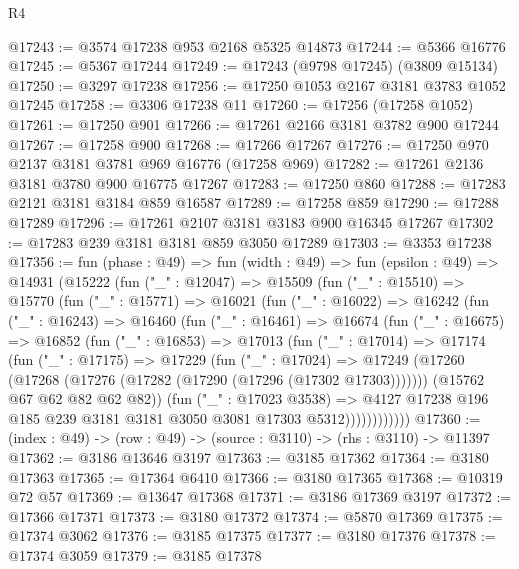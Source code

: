 \begin{lexlean}{R4}
\begin{coremodule}
@17243 := @3574 @17238 @953 @2168 @5325 @14873
@17244 := @5366 @16776
@17245 := @5367 @17244
@17249 := @17243 (@9798 @17245) (@3809 @15134)
@17250 := @3297 @17238
@17256 := @17250 @1053 @2167 @3181 @3783 @1052 @17245
@17258 := @3306 @17238 @11
@17260 := @17256 (@17258 @1052)
@17261 := @17250 @901
@17266 := @17261 @2166 @3181 @3782 @900 @17244
@17267 := @17258 @900
@17268 := @17266 @17267
@17276 := @17250 @970 @2137 @3181 @3781 @969 @16776 (@17258 @969)
@17282 := @17261 @2136 @3181 @3780 @900 @16775 @17267
@17283 := @17250 @860
@17288 := @17283 @2121 @3181 @3184 @859 @16587
@17289 := @17258 @859
@17290 := @17288 @17289
@17296 := @17261 @2107 @3181 @3183 @900 @16345 @17267
@17302 := @17283 @239 @3181 @3181 @859 @3050 @17289
@17303 := @3353 @17238
@17356 := fun (phase : @49) =>
  fun (width : @49) =>
  fun (epsilon : @49) =>
  @14931
    (@15222
      (fun ("_" : @12047) =>
      @15509
        (fun ("_" : @15510) =>
        @15770
          (fun ("_" : @15771) =>
          @16021
            (fun ("_" : @16022) =>
            @16242
              (fun ("_" : @16243) =>
              @16460
                (fun ("_" : @16461) =>
                @16674
                  (fun ("_" : @16675) =>
                  @16852
                    (fun ("_" : @16853) =>
                    @17013
                      (fun ("_" : @17014) =>
                      @17174
                        (fun ("_" : @17175) =>
                        @17229
                          (fun ("_" : @17024) =>
                          @17249
                            (@17260 (@17268 (@17276 (@17282 (@17290 (@17296 (@17302 @17303)))))))
                            (@15762 @67 @62 @82 @62 @82))
                          (fun ("_" : @17023 @3538) =>
                          @4127
                            @17238
                            @196
                            @185
                            @239
                            @3181
                            @3181
                            @3050
                            @3081
                            @17303
                            @5312))))))))))))
@17360 := (index : @49) -> (row : @49) -> (source : @3110) -> (rhs : @3110) -> @11397
@17362 := @3186 @13646 @3197
@17363 := @3185 @17362
@17364 := @3180 @17363
@17365 := @17364 @6410
@17366 := @3180 @17365
@17368 := @10319 @72 @57
@17369 := @13647 @17368
@17371 := @3186 @17369 @3197
@17372 := @17366 @17371
@17373 := @3180 @17372
@17374 := @5870 @17369
@17375 := @17374 @3062
@17376 := @3185 @17375
@17377 := @3180 @17376
@17378 := @17374 @3059
@17379 := @3185 @17378

\end{coremodule}
\end{lexlean}
